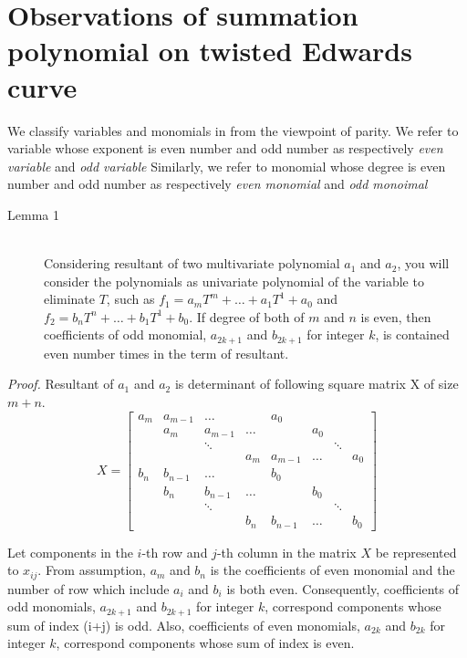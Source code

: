 \section{Observations of summation polynomial on twisted Edwards
  curve}
\label{sec:twisted-edwards-summation-polynomial}

We classify variables and monomials in from the viewpoint of parity. 
%
We refer to variable whose exponent is even number and odd number 
as respectively \emph{even variable} and \emph{odd variable}
%
Similarly, we refer to monomial whose degree is even number and odd number 
as respectively \emph{even monomial} and \emph{odd monoimal}


\begin{description}
  \item [Lemma 1]~\\
  Considering resultant of two multivariate polynomial $a_1$ and $a_2$,
  you will consider the polynomials as univariate polynomial of the variable
  to eliminate $T$, such as $f_1 = a_mT^m + \dots +a_1T^1 + a_0$ 
  and $f_2 = b_nT^n + \dots +b_1T^1 + b_0$.
  If degree of both of $m$ and $n$ is even, 
  then coefficients of odd monomial, $a_{2k+1}$ and $b_{2k+1}$ for integer $k$,
  is contained even number times in the term of resultant.
\end{description}

\noindent
\emph{Proof.}
%
Resultant of $a_1$ and $a_2$ is 
determinant of following square matrix X of size $m+n$.
%
\begin{equation*}
X =
\begin{bmatrix}
  a_m & a_{m-1} & \ldots & & a_0 & & &  \\
          & a_m & a_{m-1} & \ldots & & a_0  & &  \\
  & & \ddots & & & & \ddots &  \\
    & & & a_m & a_{m-1} & \ldots & & a_0  \\
  b_n & b_{n-1} & \ldots & & b_0 & & &  \\
       & b_n & b_{n-1} & \ldots & & b_0  & &  \\
  & & \ddots & & & & \ddots &  \\
    & & & b_n & b_{n-1} & \ldots & & b_0
\end{bmatrix}
\end{equation*}

Let components in the $i$-th row and $j$-th column in the matrix $X$ 
be represented to $x_{ij}$. 
%
From assumption, $a_m$ and $b_n$ is the coefficients of even monomial
and the number of row which include $a_i$ and $b_i$ is both even.
%
Consequently, coefficients of odd monomials, $a_{2k+1}$ and $b_{2k+1}$ 
for integer $k$, correspond components whose sum of index (i+j) is odd.
%
Also, coefficients of even monomials, $a_{2k}$ and $b_{2k}$ for 
integer $k$, correspond components whose sum of index is even.

